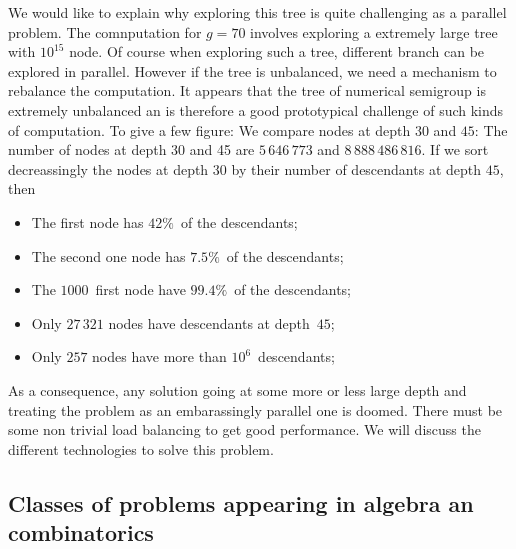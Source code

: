 \documentclass{deliverablereport}
\begin{document}
We would like to explain why exploring this tree is quite challenging as a
parallel problem. The comnputation for $g=70$ involves exploring a extremely
large tree with $10^{15}$ node. Of course when exploring such a tree,
different branch can be explored in parallel. However if the tree is
unbalanced, we need a mechanism to rebalance the computation. It appears that
the tree of numerical semigroup is extremely unbalanced an is therefore a good
prototypical challenge of such kinds of computation. To give a few figure: We
compare nodes at depth $30$ and $45$: The number of nodes at depth 30 and 45
are $5\,646\,773$ and $8\,888\,486\,816$. If we sort decreassingly the nodes
at depth $30$ by their number of descendants at depth $45$, then
\begin{itemize}
\item The first node has $42\%$~of the descendants;
\item The second one node has $7.5\%$~of the descendants;
\item The $1000$~first node have $99.4\%$~of the descendants;
\item Only $27\,321$ nodes have descendants at depth~$45$;
\item Only $257$ nodes have more than $10^6$~descendants;
\end{itemize}
As a consequence, any solution going at some more or less large depth and
treating the problem as an embarassingly parallel one is doomed. There must be
some non trivial load balancing to get good performance.  We will discuss the
different technologies to solve this problem.

 
\subsection{Classes of problems appearing in algebra an combinatorics}
\end{document}
